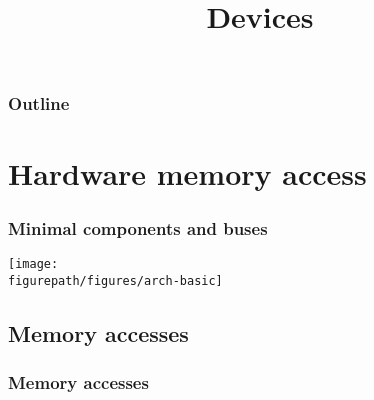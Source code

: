 %
%
%
%
%
%

%
%


%
%

\title{Devices}

%
%



%
%

\begin{frame}
  \titlepage
\end{frame}

%
%

\begin{frame}
  \frametitle{Outline}

  \tableofcontents
\end{frame}


\section{Hardware memory access}
\begin{frame}
  \frametitle{Minimal components and buses}
  \begin{center}
    \texttt{[image: \\figurepath/figures/arch-basic]}
  \end{center}
\end{frame}


\subsection{Memory accesses}
\begin{frame}
  \frametitle{Memory accesses}
  \begin{center}
    \begin{overlayarea}{10cm}{10cm}
    \end{overlayarea}
  \end{center}
\end{frame}

